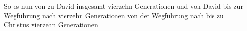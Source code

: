 \documentclass[14pt]{article}
\begin{document}
So  es nun von   zu David insgesamt vierzehn Generationen und von David bis zur Wegführung nach  vierzehn Generationen  von der Wegführung nach  bis zu Christus vierzehn Generationen.
\end{document}
